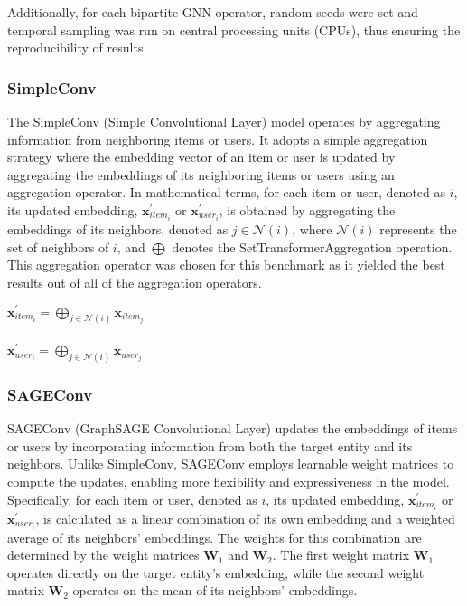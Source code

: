 \documentclass[bst/sn-nature]{sn-jnl}
\begin{document}
\begin{multicols}{2}
Additionally, for each bipartite GNN operator, random seeds were set and temporal sampling was run on central processing units (CPUs), thus ensuring the reproducibility of results.


\subsubsection{SimpleConv}

\quad The SimpleConv (Simple Convolutional Layer) model operates by aggregating information from neighboring items or users. It adopts a simple aggregation strategy where the embedding vector of an item or user is updated by aggregating the embeddings of its neighboring items or users using an aggregation operator. In mathematical terms, for each item or user, denoted as $i$, its updated embedding, $\mathbf{x}^{\prime}_{item_i}$ or $\mathbf{x}^{\prime}_{user_i}$, is obtained by aggregating the embeddings of its neighbors, denoted as $j \in \mathcal{N}(i)$, where $\mathcal{N}(i)$ represents the set of neighbors of $i$, and $\bigoplus$ denotes the SetTransformerAggregation\cite{simpleconv} operation. This aggregation operator was chosen for this benchmark as it yielded the best results out of all of the aggregation operators. \\ 

\begin{center}
    $\mathbf{x}^{\prime}_{item_{i}} = \bigoplus_{j \in \mathcal{N}(i)} \mathbf{x}_{item_{j}}$ \\~\\
    $\mathbf{x}^{\prime}_{user_{i}} = \bigoplus_{j \in \mathcal{N}(i)} \mathbf{x}_{user_{j}}$
\end{center}

\subsubsection{SAGEConv\cite{sageconv}} 

\quad SAGEConv (GraphSAGE Convolutional Layer) updates the embeddings of items or users by incorporating information from both the target entity and its neighbors. Unlike SimpleConv, SAGEConv employs learnable weight matrices to compute the updates, enabling more flexibility and expressiveness in the model. Specifically, for each item or user, denoted as $i$, its updated embedding, $\mathbf{x}^{\prime}_{item_i}$ or $\mathbf{x}^{\prime}_{user_i}$, is calculated as a linear combination of its own embedding and a weighted average of its neighbors' embeddings. The weights for this combination are determined by the weight matrices $\mathbf{W}_1$ and $\mathbf{W}_2$. The first weight matrix $\mathbf{W}_1$ operates directly on the target entity's embedding, while the second weight matrix $\mathbf{W}_2$ operates on the mean of its neighbors' embeddings. \\ 


\end{multicols}
\end{document}

